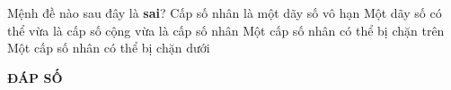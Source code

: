 \begin{ex}%
	Mệnh đề nào sau đây là \textbf{sai}?
	\choice
	{\True Cấp số nhân là một dãy số vô hạn}
	{Một dãy số có thể vừa là cấp số cộng vừa là cấp số nhân}
	{Một cấp số nhân có thể bị chặn trên}
	{Một cấp số nhân có thể bị chặn dưới}
\end{ex}

\newpage 
\begin{center}
	\textbf{ĐÁP SỐ}
\end{center}
\begin{multicols}{10}
	\setlength{\columnseprule}{0pt}
	 
\end{multicols}
